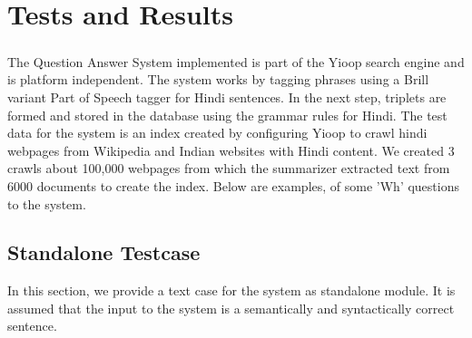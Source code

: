\chapter{Tests and Results}

\paragraph{}
The Question Answer System implemented is part of the Yioop search engine and is platform independent. The system works by tagging phrases using a Brill variant Part of Speech tagger for Hindi sentences. In the next step, triplets are formed and stored in the database using the grammar rules for Hindi. The test data for the system is an index created by configuring Yioop to crawl hindi webpages from Wikipedia and Indian websites with Hindi content. We created 3 crawls about 100,000 webpages from which the summarizer extracted text from 6000 documents to create the index. Below are examples, of some 'Wh' questions to the system.

\section {Standalone Testcase}
In this section, we provide a text case for the system as standalone module. It is assumed that the input to the system is a semantically and syntactically correct sentence.

